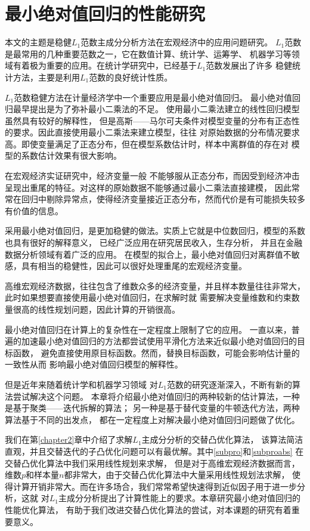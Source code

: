\section{最小绝对值回归的性能研究}\label{chapter3}

本文的主题是稳健$L_1$范数主成分分析方法在宏观经济中的应用问题研究。
$L_1$范数是最常用的几种重要范数之一，它在数值计算、统计学、运筹学、
机器学习等领域有着极为重要的应用。在统计学研究中，已经基于$L_1$范数发展出了许多
稳健统计方法，主要是利用$L_1$范数的良好统计性质。

$L_1$范数稳健方法在计量经济学中一个重要应用是最小绝对值回归。
最小绝对值回归最早提出是为了弥补最小二乘法的不足。
使用最小二乘法建立的线性回归模型虽然具有较好的解释性，
但是高斯——马尔可夫条件对模型变量的分布有正态性的要求。因此直接使用最小二乘法来建立模型，往往
对原始数据的分布情况要求高。即使变量满足了正态分布，但在模型系数估计时，样本中离群值的存在对
模型的系数估计效果有很大影响。

在宏观经济实证研究中，经济变量一般
不能够服从正态分布，而因受到经济冲击呈现出重尾的特征。对这样的原始数据不能够通过最小二乘法直接建模，
因此常常在回归中剔除异常点，使得经济变量接近正态分布，然而代价是有可能损失较多有价值的信息。

采用最小绝对值回归，是更加稳健的做法。实质上它就是中位数回归，模型的系数也具有很好的解释意义，
已经广泛应用在研究居民收入\cite{dasgupta2004least}，生存分析\cite{ying1995survival}，
并且在金融数据分析领域有着广泛的应用\cite{dasgupta2004least}。
在模型的拟合上，最小绝对值回归对离群值不敏感，具有相当的稳健性，因此可以很好处理重尾的宏观经济变量。

高维宏观经济数据，往往包含了维数众多的经济变量，并且样本数量往往非常大，
此时如果想要直接使用最小绝对值回归，在求解时就
需要解决变量维数和约束数量很高的线性规划问题，因此计算的开销很高。

最小绝对值回归在计算上的复杂性在一定程度上限制了它的应用。
一直以来，普遍的加速最小绝对值回归的方法都尝试使用平滑化方法来近似最小绝对值回归的目标函数，
避免直接使用原目标函数。然而，替换目标函数，可能会影响估计量的一致性从而
影响最小绝对值回归模型的解释性。

但是近年来随着统计学和机器学习领域
对$L_1$范数的研究逐渐深入，不断有新的算法尝试解决这个问题。
本章将介绍最小绝对值回归的两种较新的估计算法，一种是基于聚类——迭代拆解的算法；
另一种是基于替代变量的牛顿迭代方法，两种算法基于不同的出发点，
都在一定程度上对解决最小绝对值回归问题做了优化。

我们在第\ref{chapter2}章中介绍了求解$L_1$主成分分析的交替凸优化算法，
该算法简洁直观，并且交替迭代的子凸优化问题可以有最优解。其中\eqref{subpro}和\eqref{subproabs}
在交替凸优化算法中我们采用线性规划来求解，
但是对于高维宏观经济数据而言，维数$p$和样本量$n$都非常大，由于交替凸优化算法中大量采用线性规划法求解，
使得计算开销非常大。而在许多场合，我们常常希望快速得到近似因子用于进一步分析，这就
对$L_1$主成分分析提出了计算性能上的要求。本章研究最小绝对值回归的性能优化算法，
有助于我们改进交替凸优化算法的尝试，对本课题的研究有着重要意义。


